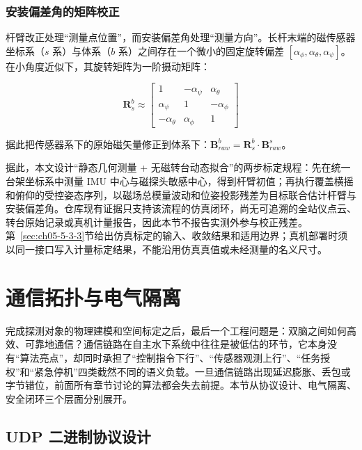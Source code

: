 \subsubsection{安装偏差角的矩阵校正}\label{sec:ch02-2-4-2-2}

杆臂改正处理``测量点位置''，而安装偏差角处理``测量方向''。长杆末端的磁传感器坐标系（\(s\) 系）与体系（\(b\) 系）之间存在一个微小的固定旋转偏差 \([\alpha_\phi, \alpha_\theta, \alpha_\psi]\)。在小角度近似下，其旋转矩阵为一阶摄动矩阵：

\begin{equation}
\boldsymbol{R}_s^b \approx \begin{bmatrix} 1 & -\alpha_\psi & \alpha_\theta \\ \alpha_\psi & 1 & -\alpha_\phi \\ -\alpha_\theta & \alpha_\phi & 1 \end{bmatrix}
\label{eq:ch02-misalignment}
\end{equation}

据此把传感器系下的原始磁矢量修正到体系下：\(\boldsymbol{B}_{raw}^b = \boldsymbol{R}_s^b \cdot \boldsymbol{B}_{raw}^s\)。

据此，本文设计``静态几何测量 + 无磁转台动态拟合''的两步标定规程：先在统一台架坐标系中测量 IMU 中心与磁探头敏感中心，得到杆臂初值；再执行覆盖横摇和俯仰的受控姿态序列，以磁场总模量波动和位姿投影残差为目标联合估计杆臂与安装偏差角。仓库现有证据只支持该流程的仿真闭环，尚无可追溯的全站仪点云、转台原始记录或真机计量报告，因此本节不报告实测外参与校正残差。第~\ref{sec:ch05-5-3-3}节给出仿真标定的输入、收敛结果和适用边界；真机部署时须以同一接口写入计量标定结果，不能沿用仿真真值或未经测量的名义尺寸。

\section{通信拓扑与电气隔离}\label{sec:ch02-2-5}

完成探测对象的物理建模和空间标定之后，最后一个工程问题是：双脑之间如何高效、可靠地通信？通信链路在自主水下系统中往往是被低估的环节，它本身没有``算法亮点''，却同时承担了``控制指令下行''、``传感器观测上行''、``任务授权''和``紧急停机''四类截然不同的语义负载。一旦通信链路出现延迟膨胀、丢包或字节错位，前面所有章节讨论的算法都会失去前提。本节从协议设计、电气隔离、安全闭环三个层面分别展开。

\subsection{UDP 二进制协议设计}\label{sec:ch02-2-5-1}

